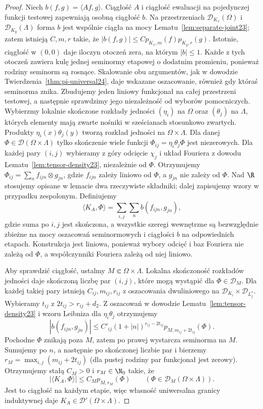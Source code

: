 \begin{proof}
Niech $b(f,g)=\langle Af,g\rangle$. Ciągłość $A$
i ciągłość ewaluacji na pojedynczej funkcji testowej
zapewniają osobną ciągłość $b$. Na przestrzeniach
$\mathcal D_{K_x}(\Omega)$ i $\mathcal D_{K_y}(\Lambda)$
forma $b$ jest wspólnie ciągła na mocy
Lematu~\ref{lem:separate-joint23}; zatem istnieją
$C,m,r$ takie, że
$|b(f,g)|\le C p_{K_x,m}(f)p_{K_y,r}(g)$.
Istotnie, ciągłość w $(0,0)$ daje iloczyn otoczeń
zera, na którym $|b|\le1$. Każde z tych otoczeń
zawiera kulę jednej seminormy etapowej o dodatnim
promieniu, ponieważ rodziny seminorm są rosnące.
Skalowanie obu argumentów, jak w dowodzie
Twierdzenia~\ref{thm:pi-universal24}, daje wskazane
oszacowanie, również gdy któraś seminorma znika.
Zbudujemy jeden liniowy funkcjonał na całej przestrzeni
testowej, a następnie sprawdzimy jego niezależność
od wyborów pomocniczych. Wybierzmy lokalnie skończone
rozkłady jedności $(\eta_i)$ na $\Omega$ oraz
$(\theta_j)$ na $\Lambda$, których elementy mają zwarte
nośniki w sześcianach stosunkowo zwartych. Produkty
$\eta_i(x)\theta_j(y)$ tworzą rozkład jedności na
$\Omega\times\Lambda$. Dla danej
$\Phi\in\mathcal D(\Omega\times\Lambda)$ tylko skończenie
wiele funkcji $\Phi_{ij}=\eta_i\theta_j\Phi$ jest niezerowych.
Dla każdej pary $(i,j)$ wybieramy z góry odcięcie
$\chi_j$ i układ Fouriera z dowodu
Lematu~\ref{lem:tensor-density23}, niezależnie od $\Phi$.
Otrzymujemy $\Phi_{ij}=\sum_n f_{ijn}\otimes g_{jn}$,
gdzie $f_{ijn}$ zależy liniowo od $\Phi$,
a $g_{jn}$ nie zależy od $\Phi$.
Nad $\R$ stosujemy opisane w lemacie dwa rzeczywiste
składniki; dalej zapisujemy wzory w przypadku zespolonym.
Definiujemy
\[
 \langle K_A,\Phi\rangle=\sum_{i,j}\sum_n b(f_{ijn},g_{jn}),
\]
gdzie suma po $i,j$ jest skończona, a wszystkie szeregi
wewnętrzne są bezwzględnie zbieżne na mocy oszacowań
seminormowych i ciągłości $b$ na odpowiednich etapach.
Konstrukcja jest liniowa, ponieważ wybory odcięć i baz
Fouriera nie zależą od $\Phi$, a współczynniki Fouriera
zależą od niej liniowo.

Aby sprawdzić ciągłość, ustalmy $M\Subset\Omega\times\Lambda$.
Lokalna skończoność rozkładów jedności daje skończoną
liczbę par $(i,j)$, które mogą wystąpić dla
$\Phi\in\mathcal D_M$. Dla każdej takiej pary istnieją $C_{ij},m_{ij},r_{ij}$
z oszacowania dwuliniowego na $\mathcal D_{K_i}
\times\mathcal D_{L_j^*}$. Wybieramy $t_{ij}$ z
$2t_{ij}>r_{ij}+d_2$. Z oszacowań w dowodzie
Lematu~\ref{lem:tensor-density23} i wzoru Leibniza
dla $\eta_i\theta_j$ otrzymujemy
\[
 |b(f_{ijn},g_{jn})|\le C'_{ij}
 (1+|n|)^{r_{ij}-2t_{ij}}
 p_{M,m_{ij}+2t_{ij}}(\Phi).
\]
Pochodne $\Phi$ znikają poza $M$, zatem po prawej
wystarcza seminorma na $M$. Sumujemy po $n$,
a następnie po skończonej liczbie par i bierzemy
$r_M=\max_{i,j}(m_{ij}+2t_{ij})$ (dla pustej
rodziny par funkcjonał jest zerowy). Otrzymujemy
stałą $C_M>0$ i $r_M\in\N_0$ takie, że
\[
 |\langle K_A,\Phi\rangle|\le C_M p_{M,r_M}(\Phi)
 \qquad (\Phi\in\mathcal D_M(\Omega\times\Lambda)).
\]
Jest to ciągłość na każdym etapie, więc własność
uniwersalna granicy induktywnej daje
$K_A\in\mathcal D'(\Omega\times\Lambda)$.


\end{proof}
